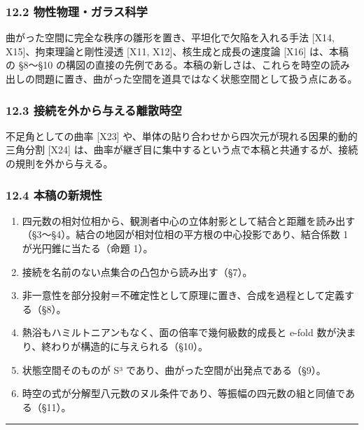 \documentclass[
  a4paper,
]{ltjsarticle}
\providecommand{\tightlist}{%
  \setlength{\itemsep}{0pt}\setlength{\parskip}{0pt}}
\begin{document}
\subsubsection{12.2
物性物理・ガラス科学}\label{ux7269ux6027ux7269ux7406ux30acux30e9ux30b9ux79d1ux5b66}

曲がった空間に完全な秩序の雛形を置き、平坦化で欠陥を入れる手法 {[}X14,
X15{]}、拘束理論と剛性浸透 {[}X11, X12{]}、核生成と成長の速度論
{[}X16{]} は、本稿の §8〜§10
の構図の直接の先例である。本稿の新しさは、これらを時空の読み出しの問題に置き、曲がった空間を道具ではなく状態空間として扱う点にある。

\subsubsection{12.3
接続を外から与える離散時空}\label{ux63a5ux7d9aux3092ux5916ux304bux3089ux4e0eux3048ux308bux96e2ux6563ux6642ux7a7a}

不足角としての曲率 {[}X23{]}
や、単体の貼り合わせから四次元が現れる因果的動的三角分割 {[}X24{]}
は、曲率が継ぎ目に集中するという点で本稿と共通するが、接続の規則を外から与える。

\subsubsection{12.4
本稿の新規性}\label{ux672cux7a3fux306eux65b0ux898fux6027}

\begin{enumerate}
\def\labelenumi{\arabic{enumi}.}
\tightlist
\item
  四元数の相対位相から、観測者中心の立体射影として結合と距離を読み出す（§3〜§4）。結合の地図が相対位相の平方根の中心投影であり、結合係数
  1 が光円錐に当たる（命題 1）。
\item
  接続を名前のない点集合の凸包から読み出す（§7）。
\item
  非一意性を部分投射＝不確定性として原理に置き、合成を過程として定義する（§8）。
\item
  熱浴もハミルトニアンもなく、面の倍率で幾何級数的成長と e-fold
  数が決まり、終わりが構造的に与えられる（§10）。
\item
  状態空間そのものが S³ であり、曲がった空間が出発点である（§9）。
\item
  時空の式が分解型八元数のヌル条件であり、等振幅の四元数の組と同値である（§11）。
\end{enumerate}

\begin{center}\rule{0.5\linewidth}{0.5pt}\end{center}
\end{document}
